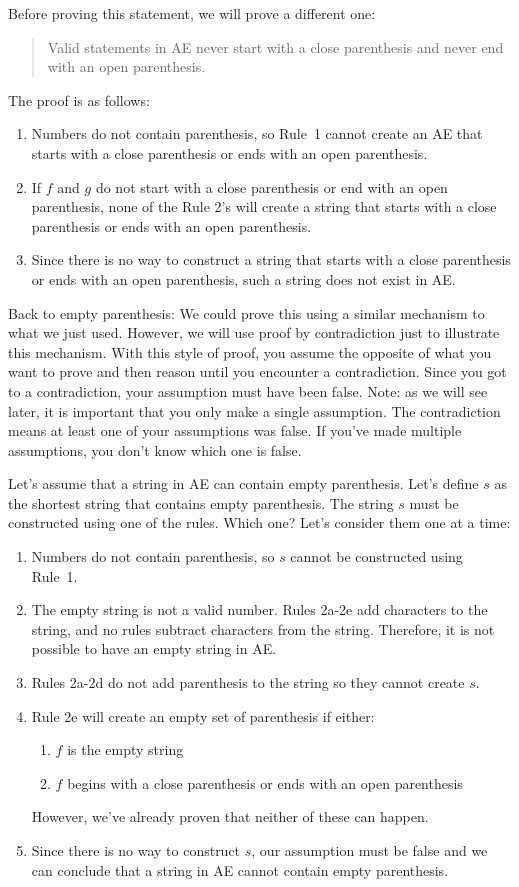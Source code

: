 \documentclass[letterpaper,12pt,openany,reqno]{book}%
\begin{document}
Before proving this statement, we will prove a different one:
\begin{quote}
Valid statements in AE never start with a close parenthesis and never end with an open parenthesis.
\end{quote}
The proof is as follows:
\begin{enumerate}
\item Numbers do not contain parenthesis, so Rule~1 cannot create an AE that starts with a close parenthesis or ends with an open parenthesis.
\item If $f$ and $g$ do not start with a close parenthesis or end with an open parenthesis, none of the Rule 2's will create a string that starts with a close parenthesis or ends with an open parenthesis.
\item Since there is no way to construct a string that starts with a close parenthesis or ends with an open parenthesis, such a string does not exist in AE.
\end{enumerate}

Back to empty parenthesis: We could prove this using a similar mechanism to what we just used. However, we will use proof by contradiction just to illustrate this mechanism. With this style of proof, you assume the opposite of what you want to prove and then reason until you encounter a contradiction. Since you got to a contradiction, your assumption must have been false. Note: as we will see later, it is important that you only make a single assumption. The contradiction means at least one of your assumptions was false. If you've made multiple assumptions, you don't know which one is false.

Let's assume that a string in AE can contain empty parenthesis. Let's define $s$ as the shortest string that contains empty parenthesis. The string $s$ must be constructed using one of the rules. Which one? Let's consider them one at a time:
\begin{enumerate}
\item Numbers do not contain parenthesis, so $s$ cannot be constructed using Rule~1.
\item The empty string is not a valid number. Rules 2a-2e add characters to the string, and no rules subtract characters from the string. Therefore, it is not possible to have an empty string in AE.
\item Rules 2a-2d do not add parenthesis to the string so they cannot create $s$.
\item Rule 2e will create an empty set of parenthesis if either:
\begin{enumerate}
\item $f$ is the empty string 
\item $f$ begins with a close parenthesis or ends with an open parenthesis
\end{enumerate}
However, we've already proven that neither of these can happen.
\item Since there is no way to construct $s$, our assumption must be false and we can conclude that a string in AE cannot contain empty parenthesis.
\end{enumerate}
\end{document}

